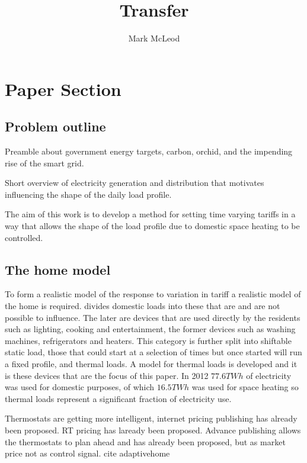 \documentclass[a4paper, 10 pt, conference]{ieeeconf}  %
\title{\LARGE \bf Transfer}
\author{Mark McLeod}
\date{}
\begin{document}
\maketitle
\thispagestyle{empty}
\pagestyle{empty}


\section{Paper Section}
\subsection{Problem outline}
Preamble about government energy targets, carbon, orchid, and the impending rise of the smart grid.

Short overview of electricity generation and distribution that motivates influencing the shape of the daily load profile.

The aim of this work is to develop a method for setting time varying tariffs in a way that allows the shape of the load profile due to domestic space heating to be controlled.

\subsection{The home model}
To form a realistic model of the response to variation in tariff a realistic model of the home is required. \cite{ramchurn2011agent} divides domestic loads into these that are and are not possible to influence. The later are devices that are used directly by the residents such as lighting, cooking and entertainment, the former devices such as washing machines, refrigerators and heaters. This category is further split into shiftable static load, those that could start at a selection of times but once started will run a fixed profile, and thermal loads. A model for thermal loads is developed and it is these devices that are the focus of this paper. In 2012 $77.6 TWh$ of electricity was used for domestic purposes, of which $16.5 TWh$ was used for space heating \cite{ecuk_data} so thermal loads represent a significant fraction of electricity use.

Thermostats are getting more intelligent, internet pricing publishing has already been proposed. RT pricing has laready been proposed. Advance publishing allows the thermostats to plan ahead and has already been proposed, but as market price not as control signal. cite adaptivehome
\end{document}
